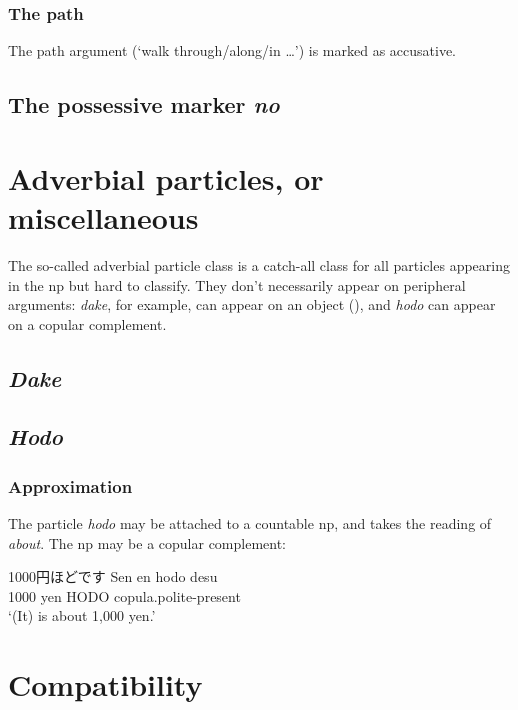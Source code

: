 \documentclass[UTF8, a4paper, oneside, scheme=plain]{ctexrep}
\newcommand{\corpus}[1]{\emph{#1}}
\newcommand{\translate}[1]{`#1'}
\begin{document}
\subsubsection{The path}

The path argument (\translate{walk through/along/in \dots}) is marked as accusative.

\subsection{The possessive marker \corpus{no}}

\section{Adverbial particles, or miscellaneous}\label{sec:adverbial-particle}

The so-called adverbial particle class is a catch-all class for all particles appearing in the \ac{np}
but hard to classify.
They don't necessarily appear on peripheral arguments:
\corpus{dake}, for example, can appear on an object (),
and \corpus{hodo} can appear on a copular complement.

\subsection{\corpus{Dake}}\label{sec:dake}

\subsection{\corpus{Hodo}}

\subsubsection{Approximation}

The particle \corpus{hodo} may be attached to a countable \ac{np},
and takes the reading of \corpus{about}.
The \ac{np} may be a copular complement:
\begin{exe}
    \ex 1000円ほどです 
    \gll Sen en hodo desu \\
    1000 yen HODO \acs{copula}.\acs{polite}-\acs{present} \\
    \glt \translate{(It) is about 1,000 yen.}
\end{exe}

\section{Compatibility}\label{sec:particle-compatible}
\end{document}
